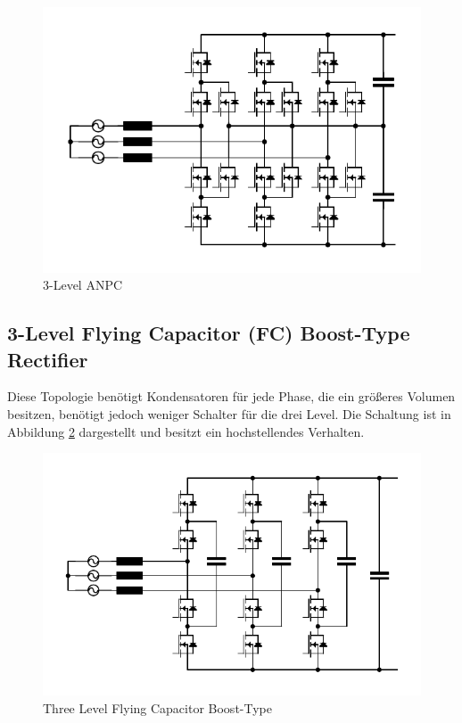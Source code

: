 		\begin{figure}
			\centering
			\includegraphics[width=0.9\linewidth]{content/Grafiken/ANPC}
			\caption{3-Level ANPC}
			\label{fig:anpc}
		\end{figure}
	
	
	\subsection{3-Level Flying Capacitor (FC) Boost-Type Rectifier}
		Diese Topologie benötigt Kondensatoren für jede Phase, die ein größeres Volumen besitzen, benötigt jedoch weniger Schalter für die drei Level. Die Schaltung ist in Abbildung \ref{fig:3l-fc-boost} dargestellt und besitzt ein hochstellendes Verhalten.
		\begin{figure}
			\centering
			\includegraphics[width=1\linewidth]{content/Grafiken/3L-FC-Boost}
			\caption{Three Level Flying Capacitor Boost-Type}
			\label{fig:3l-fc-boost}
		\end{figure}
	
